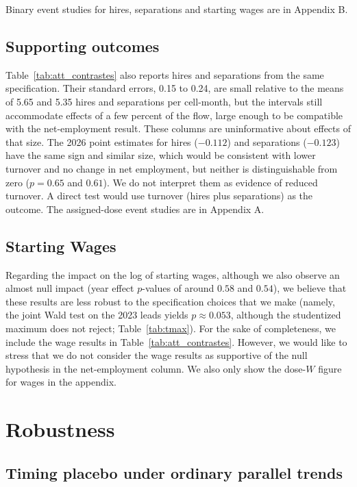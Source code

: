 \documentclass[12pt,a4paper]{article}
\begin{document}
Binary event studies for hires, separations and starting wages are in Appendix B.

\subsection{Supporting outcomes}
\label{sec:apoio}

Table~\ref{tab:att_contrastes} also reports hires and separations from the same specification. Their standard errors, 0.15 to 0.24, are small relative to the means of 5.65 and 5.35 hires and separations per cell-month, but the intervals still accommodate effects of a few percent of the flow, large enough to be compatible with the net-employment result. These columns are uninformative about effects of that size. The 2026 point estimates for hires ($-0.112$) and separations ($-0.123$) have the same sign and similar size, which would be consistent with lower turnover and no change in net employment, but neither is distinguishable from zero ($p=0.65$ and $0.61$). We do not interpret them as evidence of reduced turnover. A direct test would use turnover (hires plus separations) as the outcome. The assigned-dose event studies are in Appendix A.

\subsection{Starting Wages}\label{sec:wage_caveat}

Regarding the impact on the log of starting wages, although we also observe an almost null impact (year effect $p$-values of around $0.58$ and $0.54$), we believe that these results are less robust to the specification choices that we make (namely, the joint Wald test on the 2023 leads yields $p\approx0.053$, although the studentized maximum does not reject; Table~\ref{tab:tmax}). For the sake of completeness, we include the wage results in Table~\ref{tab:att_contrastes}. However, we would like to stress that we do not consider the wage results as supportive of the null hypothesis in the net-employment column. We also only show the dose-$W$ figure for wages in the appendix.
\section{Robustness}
\label{sec:robustness}

\subsection{Timing placebo under ordinary parallel trends}
\end{document}
